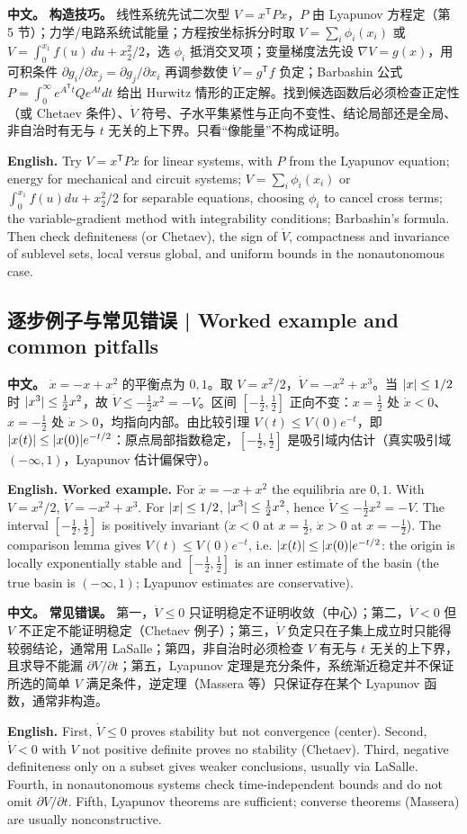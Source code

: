 \documentclass[UTF8,11pt,a4paper]{ctexart}
\newcommand{\APS}[2]{\par\noindent\textbf{中文。} #1\par\noindent\textbf{English.} #2\par}
\begin{document}
\APS{\textbf{构造技巧。} 线性系统先试二次型 $V=x^{\mathsf T}Px$，$P$ 由 Lyapunov 方程定（第 5 节）；力学/电路系统试能量；方程按坐标拆分时取 $V=\sum_i\phi_i(x_i)$ 或 $V=\int_0^{x_1}f(u)\,du+x_2^2/2$，选 $\phi_i$ 抵消交叉项；变量梯度法先设 $\nabla V=g(x)$，用可积条件 $\partial g_i/\partial x_j=\partial g_j/\partial x_i$ 再调参数使 $\dot V=g^{\mathsf T}f$ 负定；Barbashin 公式 $P=\int_0^\infty e^{A^{\mathsf T}t}Qe^{At}dt$ 给出 Hurwitz 情形的正定解。找到候选函数后必须检查正定性（或 Chetaev 条件）、$\dot V$ 符号、子水平集紧性与正向不变性、结论局部还是全局、非自治时有无与 $t$ 无关的上下界。只看“像能量”不构成证明。}{Try $V=x^{\mathsf T}Px$ for linear systems, with $P$ from the Lyapunov equation; energy for mechanical and circuit systems; $V=\sum_i\phi_i(x_i)$ or $\int_0^{x_1}f(u)du+x_2^2/2$ for separable equations, choosing $\phi_i$ to cancel cross terms; the variable-gradient method with integrability conditions; Barbashin's formula. Then check definiteness (or Chetaev), the sign of $\dot V$, compactness and invariance of sublevel sets, local versus global, and uniform bounds in the nonautonomous case.}

\subsection{逐步例子与常见错误 | Worked example and common pitfalls}
\APS{$\dot x=-x+x^2$ 的平衡点为 $0,1$。取 $V=x^2/2$，$\dot V=-x^2+x^3$。当 $\lvert x\rvert\le1/2$ 时 $\lvert x^3\rvert\le\frac12x^2$，故 $\dot V\le-\frac12x^2=-V$。区间 $[-\frac12,\frac12]$ 正向不变：$x=\frac12$ 处 $\dot x<0$、$x=-\frac12$ 处 $\dot x>0$，均指向内部。由比较引理 $V(t)\le V(0)e^{-t}$，即 $\lvert x(t)\rvert\le\lvert x(0)\rvert e^{-t/2}$：原点局部指数稳定，$[-\frac12,\frac12]$ 是吸引域内估计（真实吸引域 $(-\infty,1)$，Lyapunov 估计偏保守）。}{\textbf{Worked example.} For $\dot x=-x+x^2$ the equilibria are $0,1$. With $V=x^2/2$, $\dot V=-x^2+x^3$. For $\lvert x\rvert\le1/2$, $\lvert x^3\rvert\le\frac12x^2$, hence $\dot V\le-\frac12x^2=-V$. The interval $[-\frac12,\frac12]$ is positively invariant ($\dot x<0$ at $x=\frac12$, $\dot x>0$ at $x=-\frac12$). The comparison lemma gives $V(t)\le V(0)e^{-t}$, i.e. $\lvert x(t)\rvert\le\lvert x(0)\rvert e^{-t/2}$: the origin is locally exponentially stable and $[-\frac12,\frac12]$ is an inner estimate of the basin (the true basin is $(-\infty,1)$; Lyapunov estimates are conservative).}

\APS{\textbf{常见错误。} 第一，$\dot V\le0$ 只证明稳定不证明收敛（中心）；第二，$\dot V<0$ 但 $V$ 不正定不能证明稳定（Chetaev 例子）；第三，$\dot V$ 负定只在子集上成立时只能得较弱结论，通常用 LaSalle；第四，非自治时必须检查 $V$ 有无与 $t$ 无关的上下界，且求导不能漏 $\partial V/\partial t$；第五，Lyapunov 定理是充分条件，系统渐近稳定并不保证所选的简单 $V$ 满足条件，逆定理（Massera 等）只保证存在某个 Lyapunov 函数，通常非构造。}{First, $\dot V\le0$ proves stability but not convergence (center). Second, $\dot V<0$ with $V$ not positive definite proves no stability (Chetaev). Third, negative definiteness only on a subset gives weaker conclusions, usually via LaSalle. Fourth, in nonautonomous systems check time-independent bounds and do not omit $\partial V/\partial t$. Fifth, Lyapunov theorems are sufficient; converse theorems (Massera) are usually nonconstructive.}
\end{document}
